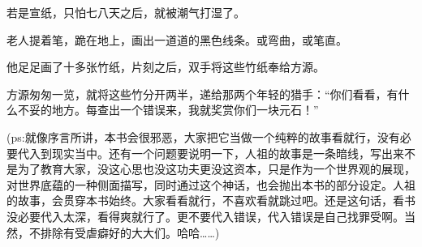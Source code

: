 \begin{this_body}
若是宣纸，只怕七八天之后，就被潮气打湿了。

老人提着笔，跪在地上，画出一道道的黑色线条。或弯曲，或笔直。

他足足画了十多张竹纸，片刻之后，双手将这些竹纸奉给方源。

方源匆匆一览，就将这些竹分开两半，递给那两个年轻的猎手：“你们看看，有什么不妥的地方。每查出一个错误来，我就奖赏你们一块元石！”

(ps:就像序言所讲，本书会很邪恶，大家把它当做一个纯粹的故事看就行，没有必要代入到现实当中。还有一个问题要说明一下，人祖的故事是一条暗线，写出来不是为了教育大家，没这心思也没这功夫更没这资本，只是作为一个世界观的展现，对世界底蕴的一种侧面描写，同时通过这个神话，也会抛出本书的部分设定。人祖的故事，会贯穿本书始终。大家看看就行，不喜欢看就跳过吧。还是这句话，看书没必要代入太深，看得爽就行了。更不要代入错误，代入错误是自己找罪受啊。当然，不排除有受虐癖好的大大们。哈哈……)

\end{this_body}

